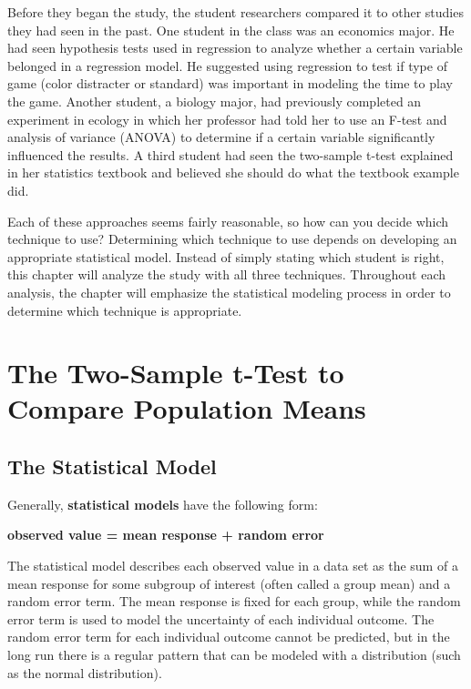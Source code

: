 \documentclass[
]{book}
\begin{document}
Before they began the study, the student researchers compared it to other studies they had seen in the past. One student in the class was an economics major. He had seen hypothesis tests used in regression to analyze whether a certain variable belonged in a regression model. He suggested using regression to test if type of game (color distracter or standard) was important in modeling the time to play the game. Another student, a biology major, had previously completed an experiment in ecology in which her professor had told her to use an F-test and analysis of variance (ANOVA) to determine if a certain variable significantly influenced the results. A third student had seen the two-sample t-test explained in her statistics textbook and believed she should do what the textbook example did.

Each of these approaches seems fairly reasonable, so how can you decide which technique to use? Determining which technique to use depends on developing an appropriate statistical model. Instead of simply stating which student is right, this chapter will analyze the study with all three techniques. Throughout each analysis, the chapter will emphasize the statistical modeling process in order to determine which technique is appropriate.

\hypertarget{the-two-sample-t-test-to-compare-population-means}{%
\section{The Two-Sample t-Test to Compare Population Means}\label{the-two-sample-t-test-to-compare-population-means}}

\par

\hypertarget{the-statistical-model}{%
\subsection{The Statistical Model}\label{the-statistical-model}}

Generally, \textbf{statistical models} have the following form:

\begin{center}
\textbf{\large observed value = mean response + random error}
\end{center}

The statistical model describes each observed value in a data set as the sum of a mean response for some subgroup of interest (often called a group mean) and a random error term. The mean response is fixed for each group, while the random error term is used to model the uncertainty of each individual outcome. The random error term for each individual outcome cannot be predicted, but in the long run there is a regular pattern that can be modeled with a distribution (such as the normal distribution).
\end{document}
